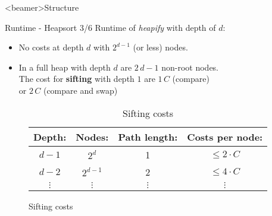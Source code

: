 \setcounter{subsubsection}{2}

\begin{frame}<beamer>{Structure}
\end{frame}

\begin{frame}{Runtime - Heapsort 3/6}
  Runtime of \textit{heapify} with depth of $d$:
  \begin{itemize}
    \item
      No costs at depth $d$ with $2^{d - 1}$ (or less) nodes.
    \item
      In a full heap with depth $d$ are $2 \, d - 1$ non-root nodes.\\
      The cost for \textbf{sifting} with depth $1$ are $1 \, C$
      ({\color{Mittel-Blau}compare})\\
      or $2 \, C$ ({\color{Mittel-Blau}compare} and {\color{Mittel-Blau}swap})
  \end{itemize}%
  \begin{figure}[!h]%
    \begin{table}%
      \begin{center}%
        \begin{tabular}{c|c|c|c}
          Depth:     & Nodes:    & Path length: & Costs per node:\\
          \hline
          $d - 1$    & $2^d$     & 1            & $\leq 2 \cdot C$\\
          $d - 2$    & $2^{d-1}$ & 2            & $\leq 4 \cdot C$\\
          $\vdots$   & $\vdots$  & $\vdots$     & $\vdots$ 
        \end{tabular}%
        \caption{Sifting costs}%
        \label{tab:sifting_costs}%
      \end{center}%
    \end{table}%
  \end{figure}
\end{frame}


